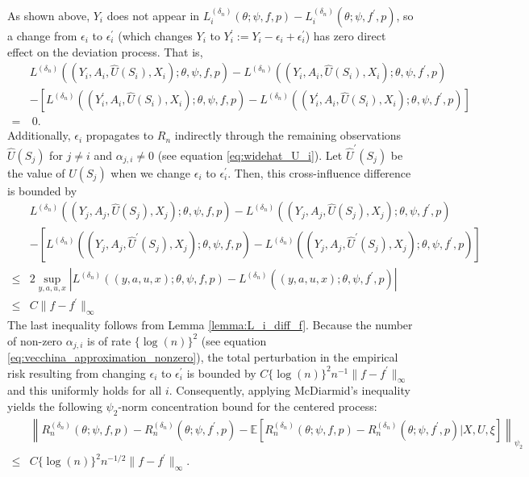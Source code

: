 \documentclass[12pt]{article}
\newcommand{\E}{\mathbb{E}}
\begin{document}
As shown above, $Y_i$ does not appear in $L^{(\delta_n)}_i(\theta;\psi,f,p) - L^{(\delta_n)}_i(\theta;\psi,f^\prime,p)$, so a change from $\epsilon_i$ to $\epsilon_i^\prime$ (which changes $Y_i$ to $Y_i^\prime := Y_i - \epsilon_i + \epsilon_i^\prime$) has zero direct effect on the deviation process. That is,
\begin{align*}
&L^{(\delta_n)}((Y_i,A_i,\widehat U(S_i),X_i);\theta,\psi,f,p) - L^{(\delta_n)}((Y_i,A_i,\widehat U(S_i),X_i);\theta,\psi,f^\prime,p)\\
        & -\left[L^{(\delta_n)}((Y_i^\prime,A_i,\widehat U(S_i),X_i);\theta,\psi,f,p) - L^{(\delta_n)}((Y_i^\prime,A_i,\widehat U(S_i),X_i);\theta,\psi,f^\prime,p)\right]\\
        = & \ 0.
\end{align*}
Additionally, $\epsilon_i$ propagates to $R_n$ indirectly through the remaining observations $\widehat U(S_j)$ for $j\neq i$ and $\alpha_{j,i}\neq 0$ (see equation \eqref{eq:widehat_U_i}). Let $\widehat U^\prime(S_j)$ be the value of $\widehat U(S_j)$ when we change $\epsilon_i$ to $\epsilon_i^\prime$. Then, this cross-influence difference is bounded by
\begin{align*}
&L^{(\delta_n)}((Y_j,A_j,\widehat U(S_j),X_j);\theta,\psi,f,p) - L^{(\delta_n)}((Y_j,A_j,\widehat U(S_j),X_j);\theta,\psi,f^\prime,p)\\
        & -\left[L^{(\delta_n)}((Y_j,A_j,\widehat U^\prime(S_j),X_j);\theta,\psi,f,p) - L^{(\delta_n)}((Y_j,A_j,\widehat U^\prime(S_j),X_j);\theta,\psi,f^\prime,p)\right]\\
        \leq  & 2\sup_{y,a,u,x}\left|L^{(\delta_n)}((y,a,u,x);\theta,\psi,f,p) - L^{(\delta_n)}((y,a,u,x);\theta,\psi,f^\prime,p)\right|\\
        \leq & C\|f-f^\prime\|_\infty
\end{align*}
The last inequality follows from Lemma \ref{lemma:L_i_diff_f}. Because the number of non-zero $\alpha_{j,i}$ is of rate $\{\log(n)\}^2$ (see equation \eqref{eq:vecchina_approximation_nonzero}), the total perturbation in the empirical risk resulting from changing $\epsilon_i$ to $\epsilon_i^\prime$ is bounded by $C\{\log(n)\}^2 n^{-1}\|f - f^\prime\|_{\infty}$ and this uniformly holds for all $i$. Consequently, applying McDiarmid's inequality yields the following $\psi_2$-norm concentration bound for the centered process:
\begin{align*}
    &\left\|R_n^{(\delta_n)}(\theta;\psi,f,p)-R_n^{({\delta_n})}(\theta;\psi,f^\prime,p)-\E\left[R_n^{(\delta_n)}(\theta;\psi,f,p)-R_n^{({\delta_n})}(\theta;\psi,f^\prime,p)|X,U,\xi\right]\right\|_{\psi_2}\\
    \leq & C\{\log(n)\}^2 n^{-1/2}\|f - f^\prime\|_{\infty}.
\end{align*}
\end{document}
